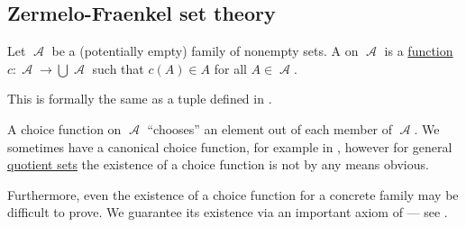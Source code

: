 \subsection{Zermelo-Fraenkel set theory}\label{subsec:zermelo_fraenkel_set_theory}

\begin{definition}\label{def:choice_function}
  Let \( \mscrA \) be a (potentially empty) family of nonempty sets. A  on \( \mscrA \) is a \hyperref[def:function]{function} \( c: \mscrA \to \bigcup \mscrA \) such that \( c(A) \in A \) for all \( A \in \mscrA \).
\end{definition}
\begin{comments}
  \item This is formally the same as a tuple defined in .

  \item A choice function on \( \mscrA \) \enquote{chooses} an element out of each member of \( \mscrA \). We sometimes have a canonical choice function, for example in , however for general \hyperref[def:equivalence_relation/quotient]{quotient sets} the existence of a choice function is not by any means obvious.

  \item Furthermore, even the existence of a choice function for a concrete family may be difficult to prove. We guarantee its existence via an important axiom of  --- see .
\end{comments}

